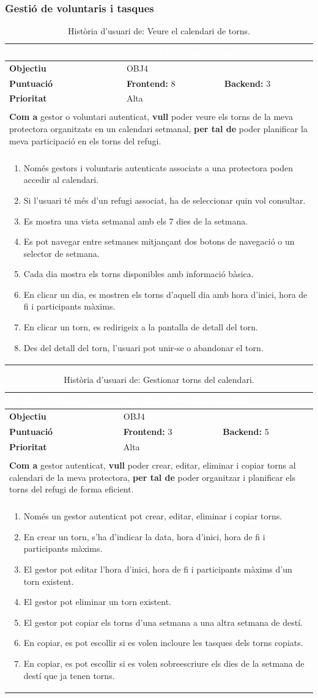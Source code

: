 \documentclass[11pt,a4paper]{report}
\newcommand{\HU}[9]{%
\begin{table}[H]\centering\footnotesize\renewcommand{\arraystretch}{1.1}%
\setlength{\extrarowheight}{0pt}%
\begin{tabular}{|l|p{4.8cm}|p{4.8cm}|}\hline
\rowcolor{oceanblue}\textcolor{white}{\textbf{Història d'Usuari}} & \multicolumn{2}{l|}{\textcolor{white}{#2}} \\\hline
\textbf{Objectiu} & \multicolumn{2}{l|}{#1} \\\hline
\rowcolor{gray!10}\textbf{Puntuació} & \textbf{Frontend: } #3 & \textbf{Backend: } #4 \\\hline
\textbf{Prioritat} & \multicolumn{2}{l|}{#5} \\\hline
\rowcolor{oceanblue}\multicolumn{3}{|l|}{\textcolor{white}{\textbf{Descripció}}} \\\hline
\multicolumn{3}{|p{12.5cm}|}{\textbf{Com a} #6, \textbf{vull} #7, \textbf{per tal de} #8.} \\\hline
\rowcolor{oceanblue}\multicolumn{3}{|l|}{\textcolor{white}{\textbf{Criteris d'Acceptació}}} \\\hline
\multicolumn{3}{|p{12.5cm}|}{\begin{enumerate}[leftmargin=0.4cm,topsep=0pt,parsep=0pt,itemsep=1pt,partopsep=0pt,after=\vspace{-3pt}] #9 \end{enumerate}} \\\hline
\end{tabular}\caption[HU: #2]{Història d'usuari de: #2.}\label{tab:hu_#1}\end{table}%
}
\begin{document}
\subsubsection{Gestió de voluntaris i tasques}
    \HU{OBJ4}
    {Veure el calendari de torns}
    {8}
    {3}
    {Alta}
    {gestor o voluntari autenticat}
    {poder veure els torns de la meva protectora organitzats en un calendari setmanal}
    {poder planificar la meva participació en els torns del refugi}
    {
        \item Només gestors i voluntaris autenticats associats a una protectora poden accedir al calendari.
        \item Si l'usuari té més d'un refugi associat, ha de seleccionar quin vol consultar.
        \item Es mostra una vista setmanal amb els 7 dies de la setmana.
        \item Es pot navegar entre setmanes mitjançant dos botons de navegació o un selector de setmana.
        \item Cada dia mostra els torns disponibles amb informació bàsica.
        \item En clicar un dia, es mostren els torns d'aquell dia amb hora d'inici, hora de fi i participants màxims.
        \item En clicar un torn, es redirigeix a la pantalla de detall del torn.
        \item Des del detall del torn, l'usuari pot unir-se o abandonar el torn.
    }
    \HU{OBJ4}
    {Gestionar torns del calendari}
    {3}
    {5}
    {Alta}
    {gestor autenticat}
    {poder crear, editar, eliminar i copiar torns al calendari de la meva protectora}
    {poder organitzar i planificar els torns del refugi de forma eficient}
    {
        \item Només un gestor autenticat pot crear, editar, eliminar i copiar torns.
        \item En crear un torn, s'ha d'indicar la data, hora d'inici, hora de fi i participants màxims.
        \item El gestor pot editar l'hora d'inici, hora de fi i participants màxims d'un torn existent.
        \item El gestor pot eliminar un torn existent.
        \item El gestor pot copiar els torns d'una setmana a una altra setmana de destí.
        \item En copiar, es pot escollir si es volen incloure les tasques dels torns copiats.
        \item En copiar, es pot escollir si es volen sobreescriure els dies de la setmana de destí que ja tenen torns.
    }
\end{document}
